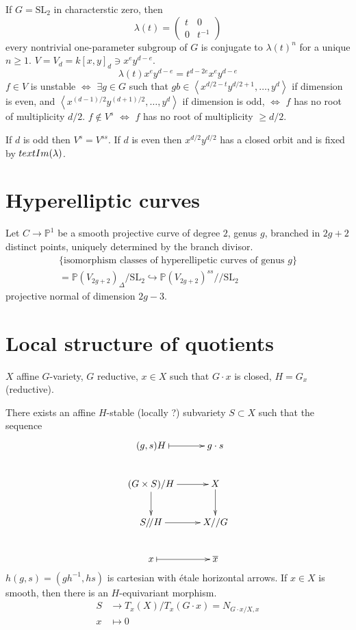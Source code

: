 \begin{example}
\label{git-label-016}
If $G=\text{SL}_2$ in characterstic zero,
then
$$
\lambda(t)=\begin{pmatrix}
t&0\\
0&t^{-1}
\end{pmatrix}
$$
every nontrivial one-parameter subgroup of
$G$ is conjugate to $\lambda(t)^n$ for a
unique $n \geq 1$. $V=V_d=k[x,y]_d\ni x^e
y^{d-e}$.
$$
\lambda(t) x^e y^{d-e}=t^{d-2e}x^ey^{d-e}
$$
$f \in V$ is unstable $\iff$ $\exists g \in
G$ such that $gb \in \left\langle{}
x^{d/2-t}y^{d/2+1},\ldots, y^d\right\rangle{}$ if
dimension is even, and $
\left\langle{}x^{(d-1)/2}y^{(d+1)/2},\ldots,
y^d\right\rangle{}$ if dimension is odd, $\iff$
$f$ has no root of multiplicity $d/2$. $f
\not \in V^s$ $\iff$ $f$ has no root of
multiplicity $\geq d/2$.

If $d$ is odd then $V^s=V^{ss}$. If $d$ is
even then $x^{d/2}y^{d/2}$ has a closed orbit
and is fixed by $\\text{Im}(\lambda)$.
\end{example}

\section{Hyperelliptic curves}
\label{section-hyperelliptic-curves}

Let $C \to \mathbb{P}^1$ be a smooth
projective curve of degree $2$, genus $g$,
branched in $2g+2$ distinct points, uniquely
determined by the branch divisor.
\begin{gather*}
\{\text{isomorphism classes of hyperellipetic
curves of genus $g$}\}\\
=\mathbb{P}(V_{2g+2})_\Delta/\text{SL}_2
\hookrightarrow
\mathbb{P}(V_{2g+2})^{ss}/\!/\text{SL}_2
\end{gather*}
projective normal of dimension $2g-3$.

\section{Local structure of quotients}
\label{section-local-structure-of-quotients-duplicate-2}
$X$ affine $G$-variety, $G$ reductive, $x\in
X$ such that $G\cdot x$ is closed, $H=G_x$
(reductive).

\begin{theorem}
\label{theorem-}
There exists an affine $H$-stable (locally ?)
subvariety $S \subset X$ such that the
sequence
$$
\xymatrix{
(g,s)H\ar@{|->}[r]&g\cdot s\\
(G\times S)/H\ar[d]\ar[r]&  X\ar[d]\\
S/\!/H\ar[r]&  X//G\\
x\ar@{|->}[r]&\overline{x}
}
$$
$h(g,s)=(gh^{-1},hs)$ is cartesian with
\'etale
horizontal arrows. If $x \in X$ is smooth,
then there is an $H$-equivariant morphism.
$$
\begin{aligned}
S &\longrightarrow T_x(X)/T_x(G\cdot
x)=N_{G\cdot x/X,x} \\
x &\longmapsto 0
\end{aligned}
$$
\end{theorem}

